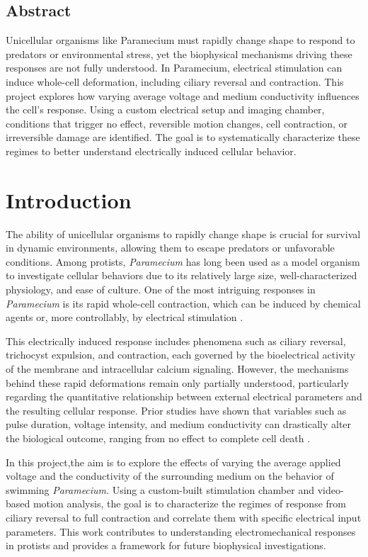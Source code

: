 \begin{center}
    \section*{Abstract}
    Unicellular organisms like Paramecium must rapidly change shape to respond to predators or environmental stress, yet the biophysical mechanisms driving these responses are not fully understood. In Paramecium, electrical stimulation can induce whole-cell deformation, including ciliary reversal and contraction. This project explores how varying average voltage and medium conductivity influences the cell’s response. Using a custom electrical setup and imaging chamber, conditions that trigger no effect, reversible motion changes, cell contraction, or irreversible damage are identified. The goal is to systematically characterize these regimes to better understand electrically induced cellular behavior.
\end{center}

\section{Introduction}

The ability of unicellular organisms to rapidly change shape is crucial for survival in dynamic environments, allowing them to escape predators or unfavorable conditions. Among protists, \textit{Paramecium} has long been used as a model organism to investigate cellular behaviors due to its relatively large size, well-characterized physiology, and ease of culture. One of the most intriguing responses in \textit{Paramecium} is its rapid whole-cell contraction, which can be induced by chemical agents or, more controllably, by electrical stimulation \cite{Miller1968, Hausmann1976}.

This electrically induced response includes phenomena such as ciliary reversal, trichocyst expulsion, and contraction, each governed by the bioelectrical activity of the membrane and intracellular calcium signaling. However, the mechanisms behind these rapid deformations remain only partially understood, particularly regarding the quantitative relationship between external electrical parameters and the resulting cellular response. Prior studies have shown that variables such as pulse duration, voltage intensity, and medium conductivity can drastically alter the biological outcome, ranging from no effect to complete cell death \cite{Mathijssen2019}.

In this project,the aim is to explore the effects of varying the average applied voltage and the conductivity of the surrounding medium on the behavior of swimming \textit{Paramecium}. Using a custom-built stimulation chamber and video-based motion analysis, the goal is to characterize the regimes of response from ciliary reversal to full contraction and correlate them with specific electrical input parameters. This work contributes to understanding electromechanical responses in protists and provides a framework for future biophysical investigations.

